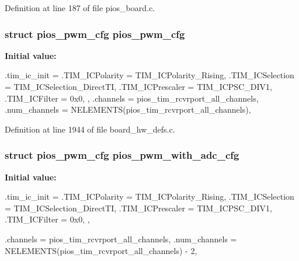 \-Definition at line 187 of file pios\-\_\-board.\-c.

\hypertarget{group___quanton_ga7587f8e174df90bef8cec1edfa9e14c1}{
\subsubsection[{pios\-\_\-pwm\-\_\-cfg}]{\setlength{\rightskip}{0pt plus 5cm}struct {\bf pios\-\_\-pwm\-\_\-cfg} {\bf pios\-\_\-pwm\-\_\-cfg}}}\label{group___quanton_ga7587f8e174df90bef8cec1edfa9e14c1}
{\bfseries \-Initial value\-:}
\begin{DoxyCode}
 {
        .tim_ic_init = {
                .TIM_ICPolarity = TIM_ICPolarity_Rising,
                .TIM_ICSelection = TIM_ICSelection_DirectTI,
                .TIM_ICPrescaler = TIM_ICPSC_DIV1,
                .TIM_ICFilter = 0x0,
        },
        .channels = pios_tim_rcvrport_all_channels,
        .num_channels = NELEMENTS(pios_tim_rcvrport_all_channels),
}
\end{DoxyCode}


\-Definition at line 1944 of file board\-\_\-hw\-\_\-defs.\-c.

\hypertarget{group___quanton_gac125e93a9cdacd5d46c2c46fd0892baf}{
\subsubsection[{pios\-\_\-pwm\-\_\-with\-\_\-adc\-\_\-cfg}]{\setlength{\rightskip}{0pt plus 5cm}struct {\bf pios\-\_\-pwm\-\_\-cfg} {\bf pios\-\_\-pwm\-\_\-with\-\_\-adc\-\_\-cfg}}}\label{group___quanton_gac125e93a9cdacd5d46c2c46fd0892baf}
{\bfseries \-Initial value\-:}
\begin{DoxyCode}
 {
        .tim_ic_init = {
                .TIM_ICPolarity = TIM_ICPolarity_Rising,
                .TIM_ICSelection = TIM_ICSelection_DirectTI,
                .TIM_ICPrescaler = TIM_ICPSC_DIV1,
                .TIM_ICFilter = 0x0,
        },
        
        .channels = pios_tim_rcvrport_all_channels,
        .num_channels = NELEMENTS(pios_tim_rcvrport_all_channels) - 2,
}
\end{DoxyCode}


